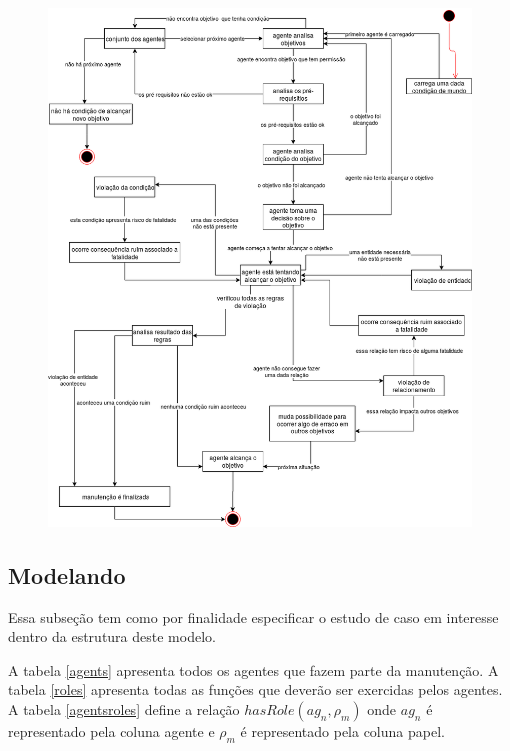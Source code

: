 \documentclass[12pt]{article}
\begin{document}
\begin{figure}[H]
  \centering
  \includegraphics[width=0.9\linewidth]{DiagramaDeEstados} 
  \caption{}
  \label{state}
\end{figure}

\subsection{Modelando}

Essa subseção tem como por finalidade especificar o estudo de caso em interesse dentro da estrutura deste modelo. 



A tabela \ref{agents} apresenta todos os agentes que fazem parte da manutenção. A tabela \ref{roles} apresenta todas as funções que deverão ser exercidas pelos agentes. A tabela \ref{agentsroles} define a relação $hasRole(ag_n,\rho_m)$ onde $ag_n$ é representado pela coluna agente e $\rho_m$ é representado pela coluna papel.
\end{document}
